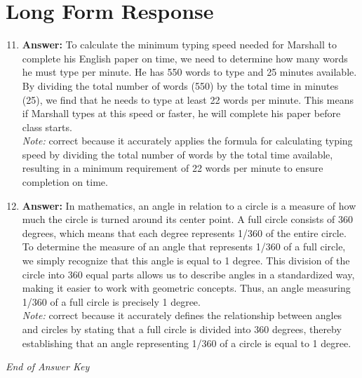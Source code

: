\documentclass[12pt]{article}
\begin{document}
\section*{Long Form Response}
\begin{enumerate}[label=\arabic*.]
\setcounter{enumi}{10}
\item \textbf{Answer:} To calculate the minimum typing speed needed for Marshall to complete his English paper on time, we need to determine how many words he must type per minute. He has 550 words to type and 25 minutes available. By dividing the total number of words (550) by the total time in minutes (25), we find that he needs to type at least 22 words per minute. This means if Marshall types at this speed or faster, he will complete his paper before class starts.
\\ \textit{Note:} correct because it accurately applies the formula for calculating typing speed by dividing the total number of words by the total time available, resulting in a minimum requirement of 22 words per minute to ensure completion on time.
\item \textbf{Answer:} In mathematics, an angle in relation to a circle is a measure of how much the circle is turned around its center point. A full circle consists of 360 degrees, which means that each degree represents 1/360 of the entire circle. To determine the measure of an angle that represents 1/360 of a full circle, we simply recognize that this angle is equal to 1 degree. This division of the circle into 360 equal parts allows us to describe angles in a standardized way, making it easier to work with geometric concepts. Thus, an angle measuring 1/360 of a full circle is precisely 1 degree.
\\ \textit{Note:} correct because it accurately defines the relationship between angles and circles by stating that a full circle is divided into 360 degrees, thereby establishing that an angle representing 1/360 of a circle is equal to 1 degree.
\end{enumerate}

\vfill
\noindent\textit{End of Answer Key}
\end{document}
